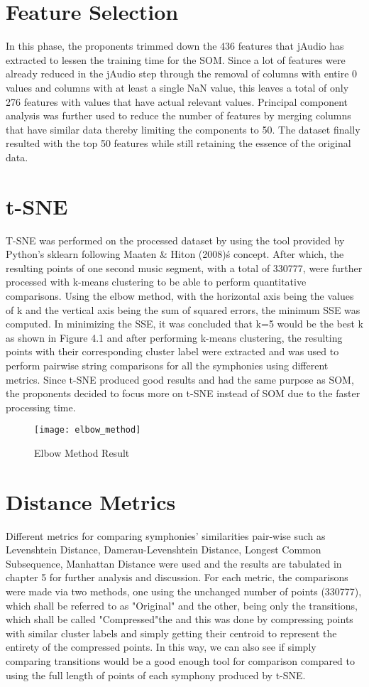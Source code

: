\section{Feature Selection}
In this phase, the proponents trimmed down the 436 features that jAudio has extracted to lessen the training time for the SOM. Since a lot of features were already reduced in the jAudio step through the removal of columns with entire 0 values and columns with at least a single NaN value, this leaves a total of only 276 features with values that have actual relevant values. Principal component analysis was further used to reduce the number of features by merging columns that have similar data thereby limiting the components to 50. The dataset finally resulted with the top 50 features while still retaining the essence of the original data.

\section{t-SNE}
T-SNE was performed on the processed dataset by using the tool provided by Python’s sklearn following Maaten \& Hiton (2008)\'s concept. After which, the resulting points of one second music segment, with a total of 330777, were further processed with k-means clustering to be able to perform quantitative comparisons. Using the elbow method, with the horizontal axis being the values of k and the vertical axis being the sum of squared errors, the minimum SSE  was computed. In minimizing the SSE, it was concluded that k=5 would be the best k as shown in Figure 4.1 and after performing k-means clustering, the resulting points with their corresponding cluster label were extracted and was used to perform pairwise string comparisons for all the symphonies using different metrics. Since t-SNE produced good results and had the same purpose as SOM, the proponents decided to focus more on t-SNE instead of SOM due to the faster processing time.

\begin{figure}[H]
\caption{Elbow Method Result}
\centering
\texttt{[image: elbow\_method]}
\end{figure}

\section{Distance Metrics}
Different metrics for comparing symphonies’ similarities pair-wise such as Levenshtein Distance, Damerau-Levenshtein Distance, Longest Common Subsequence, Manhattan Distance were used and the results are tabulated in chapter 5 for further analysis and discussion. For each metric, the comparisons were made via two methods, one using the unchanged number of points (330777), which shall be referred to as "Original" and the other, being only the transitions, which shall be called "Compressed"the  and this was done by compressing points with similar cluster labels and simply getting their centroid to represent the entirety of the compressed points. In this way, we can also see if simply comparing transitions would be a good enough tool for comparison compared to using the full length of points of each symphony produced by t-SNE.

